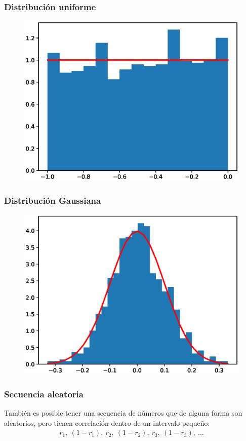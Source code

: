 \documentclass[12pt]{beamer}
\begin{document}
\begin{frame}
\frametitle{Distribución uniforme}
\begin{figure}
  \centering
  \includegraphics[scale=0.6]{Imagenes/plot_distribucion_02_uniforme.eps}
\end{figure}
\end{frame}
\begin{frame}
\frametitle{Distribución Gaussiana}
\begin{figure}
  \centering
  \includegraphics[scale=0.6]{Imagenes/plot_distribucion_03_gaussiana.eps}
\end{figure}
\end{frame}
\begin{frame}
\frametitle{Secuencia aleatoria}
También es posible tener una secuencia de números que de alguna forma son aleatorios, pero tienen correlación dentro de un intervalo pequeño:
\pause
\begin{align*}
r_{1},  \: (1 - r_{1} ), \: r_{2}, \: (1 - r_{2} ), \: r_{3}, \: (1 - r_{3} ), \: \ldots
\end{align*}
\end{frame}
\end{document}
